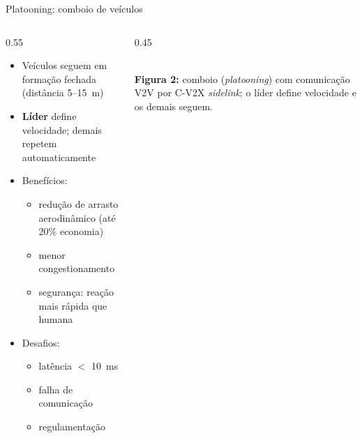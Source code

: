 \documentclass[aspectratio=169,11pt]{beamer}
\begin{document}
\begin{frame}{Platooning: comboio de veículos}
  \begin{columns}
    \begin{column}{0.55\textwidth}
      \begin{itemize}
        \item Veículos seguem em formação fechada (distância 5--15~m)
        \item \textbf{Líder} define velocidade; demais repetem automaticamente
        \item Benefícios:
          \begin{itemize}
            \item redução de arrasto aerodinâmico (até 20\% economia)
            \item menor congestionamento
            \item segurança: reação mais rápida que humana
          \end{itemize}
        \item Desafios:
          \begin{itemize}
            \item latência $<$ 10~ms
            \item falha de comunicação
            \item regulamentação
          \end{itemize}
      \end{itemize}
    \end{column}
    \begin{column}{0.45\textwidth}
      \begin{center}
        \\[1mm]
        {\scriptsize \textbf{Figura 2:} comboio (\emph{platooning}) com comunicação V2V por C-V2X \emph{sidelink}; o líder define velocidade e os demais seguem.}
      \end{center}
    \end{column}
  \end{columns}
\end{frame}
\end{document}
